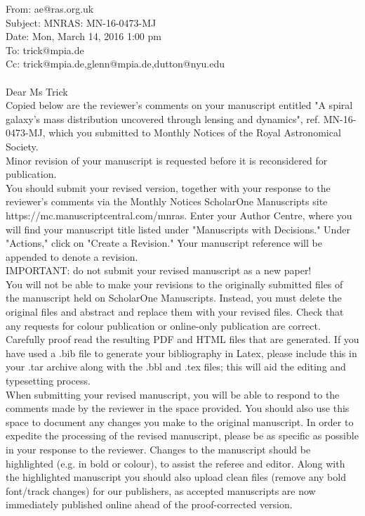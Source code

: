 \documentclass[10pt,a4paper]{article}
\begin{document}
\newpage


\noindent From:  	ae@ras.org.uk\\
Subject:  	MNRAS: MN-16-0473-MJ\\
Date:  	Mon, March 14, 2016 1:00 pm\\
To:  	trick@mpia.de\\
Cc:  	trick@mpia.de,glenn@mpia.de,dutton@nyu.edu\\\\

Dear Ms Trick\\

Copied below are the reviewer's comments on your manuscript entitled "A spiral
galaxy's mass distribution uncovered through lensing and dynamics", ref.
MN-16-0473-MJ, which you submitted to Monthly Notices of the Royal Astronomical
Society.\\

Minor revision of your manuscript is requested before it is reconsidered for
publication.\\

You should submit your revised version, together with your response to the
reviewer's comments via the Monthly Notices ScholarOne Manuscripts site
https://mc.manuscriptcentral.com/mnras.
Enter your Author Centre, where you will find your manuscript title listed under
"Manuscripts with Decisions." Under "Actions," click on "Create a Revision." Your
manuscript reference will be appended to denote a revision.\\

IMPORTANT: do not submit your revised manuscript as a new paper!\\

You will not be able to make your revisions to the originally submitted files of the
manuscript held on ScholarOne Manuscripts. Instead, you must delete the original
files and abstract and replace them with your revised files. Check that any requests
for colour publication or online-only publication are correct. Carefully proof read
the resulting PDF and HTML files that are generated. If you have used a .bib file to
generate your bibliography in Latex, please include this in your .tar archive along
with the .bbl and .tex files; this will aid the editing and typesetting process.\\

When submitting your revised manuscript, you will be able to respond to the comments
made by the reviewer in the space provided. You should also use this space to
document any changes you make to the original manuscript. In order to expedite the
processing of the revised manuscript, please be as specific as possible in your
response to the reviewer. Changes to the manuscript should be highlighted (e.g. in
bold or colour), to assist the referee and editor. Along with the highlighted
manuscript you should also upload clean files (remove any bold font/track changes)
for our publishers, as accepted manuscripts are now immediately published online
ahead of the proof-corrected version.\\
\end{document}
